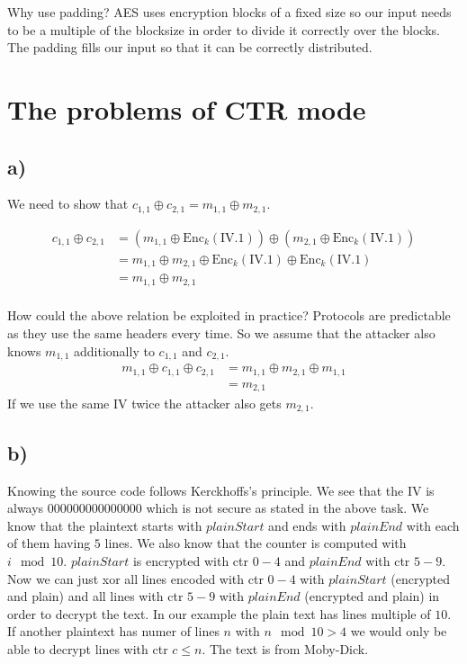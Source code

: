 \documentclass{article}
\begin{document}
Why use padding? AES uses encryption blocks of a fixed size so our input needs to be a multiple of the blocksize in order to divide it correctly over the blocks.
The padding fills our input so that it can be correctly distributed.

\section{The problems of CTR mode}

\subsection*{a)}

We need to show that $c_{1,1} \oplus c_{2,1} = m_{1,1} \oplus m_{2,1}$.

\[
\begin{aligned}
c_{1,1} \oplus c_{2,1} 
&= (m_{1,1} \oplus \mathrm{Enc}_k(\mathrm{IV}.1)) \oplus (m_{2,1} \oplus \mathrm{Enc}_k(\mathrm{IV}.1)) \\
&= m_{1,1} \oplus m_{2,1} \oplus \mathrm{Enc}_k(\mathrm{IV}.1) \oplus \mathrm{Enc}_k(\mathrm{IV}.1) \\
&= m_{1,1} \oplus m_{2,1}
\end{aligned}
\] \\ 
\newline How could the above relation be exploited in practice? 
Protocols are predictable as they use the same headers every time. So we assume that the attacker also knows $m_{1,1}$ additionally to $c_{1,1}$ and $c_{2,1}$.
\[
\begin{aligned}
m_{1,1} \oplus c_{1,1} \oplus c_{2,1} 
&= m_{1,1} \oplus m_{2,1} \oplus m_{1,1} \\
&= m_{2,1}
\end{aligned}
\]
If we use the same IV twice the attacker also gets $m_{2,1}$.

\subsection*{b)}
Knowing the source code follows Kerckhoffs's principle. We see that the IV is always 
$000000000000000$ which is not secure as stated in the above task.
We know that the plaintext starts with $plainStart$ and ends with $plainEnd$ with each of them having $5$ lines. We also know that the counter is computed with $i \mod 10$.
$plainStart$ is encrypted with ctr $0 - 4$ and $plainEnd$ with ctr $5 - 9$. Now we can just xor all lines encoded with ctr $0 - 4$ with $plainStart$ (encrypted and plain)
and all lines with ctr $5 - 9$ with $plainEnd$ (encrypted and plain) in order to decrypt the text.
In our example the plain text has lines multiple of $10$. If another plaintext has numer of lines $n$ with $n \mod 10 > 4$ we would only be able to decrypt lines with ctr
$c \leq n$.
The text is from Moby-Dick.
\end{document}

